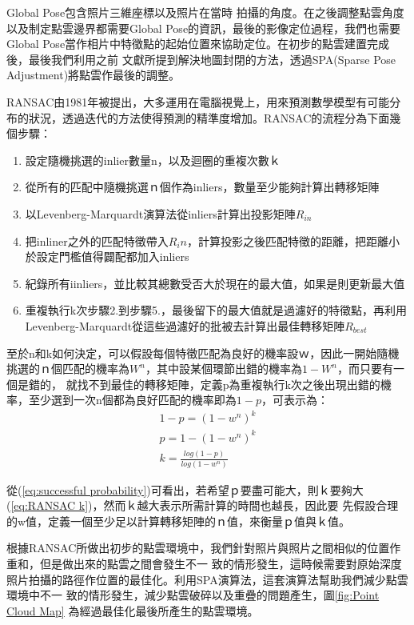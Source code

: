 Global Pose包含照片三維座標以及照片在當時
拍攝的角度。在之後調整點雲角度以及制定點雲邊界都需要Global Pose的資訊，最後的影像定位過程，我們也需要Global Pose當作相片中特徵點的起始位置來協助定位。在初步的點雲建置完成後，最後我們利用之前
文獻所提到解決地圖封閉的方法，透過SPA(Sparse Pose Adjustment)將點雲作最後的調整。

	RANSAC\cite{Fischler1981}由1981年被提出，大多運用在電腦視覺上，用來預測數學模型有可能分布的狀況，透過迭代的方法使得預測的精準度增加。RANSAC的流程分為下面幾個步驟：
　\begin{enumerate}
	  \item 設定隨機挑選的inlier數量n，以及迴圈的重複次數ｋ
	  \item 從所有的匹配中隨機挑選ｎ個作為inliers，數量至少能夠計算出轉移矩陣
	  \item 以Levenberg-Marquardt演算法從inliers計算出投影矩陣$R_{in}$
	  \item 把inliner之外的匹配特徵帶入$R_in$，計算投影之後匹配特徵的距離，把距離小於設定門檻值得闢配都加入inliers
	  \item 紀錄所有iinliers，並比較其總數受否大於現在的最大值，如果是則更新最大值
	  \item 重複執行k次步驟2.到步驟5.，最後留下的最大值就是過濾好的特徵點，再利用Levenberg-Marquardt從這些過濾好的批被去計算出最佳轉移矩陣$R_{best}$
 \end{enumerate}

	至於n和k如何決定，可以假設每個特徵匹配為良好的機率設ｗ，因此一開始隨機挑選的ｎ個匹配的機率為$W^n$，其中設某個環節出錯的機率為$1-W^n$，而只要有一個是錯的，
就找不到最佳的轉移矩陣，定義p為重複執行k次之後出現出錯的機率，至少選到一次n個都為良好匹配的機率即為$1-p$，可表示為：
\begin{align} 
	1-p = (1-w^n)^k  \label{eq:failure probability} \\
	p = 1 - (1-w^n)^k \label{eq:successful probability} \\
	k = \frac{log(1-p)}{log(1-w^n)} \label{eq:RANSAC k}
\end{align}

    從(\ref{eq:successful probability})可看出，若希望ｐ要盡可能大，則ｋ要夠大(\ref{eq:RANSAC k})，然而ｋ越大表示所需計算的時間也越長，因此要
先假設合理的w值，定義一個至少足以計算轉移矩陣的ｎ值，來衡量ｐ值與ｋ值。

根據RANSAC所做出初步的點雲環境中，我們針對照片與照片之間相似的位置作重和，但是做出來的點雲之間會發生不一
致的情形發生，這時候需要對原始深度照片拍攝的路徑作位置的最佳化。利用SPA演算法\cite{Konolige2010}，這套演算法幫助我們減少點雲環境中不一
致的情形發生，減少點雲破碎以及重疊的問題產生，圖\ref{fig:Point Cloud Map} 為經過最佳化最後所產生的點雲環境。

